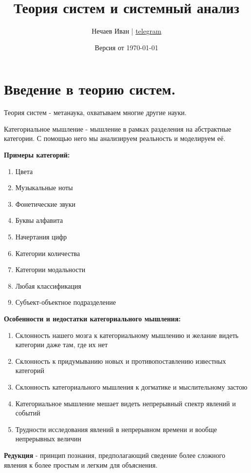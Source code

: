 \documentclass[a4paper]{article}
\title{\Huge Теория систем и системный анализ}
\author{Нечаев Иван | \href{https://t.me/mycherij}{telegram}}
\date{Версия от {\ddmmyyyydate\today} \currenttime}
\begin{document}
	\maketitle
	
	
	
	\tableofcontents
	
	\newpage
	
	\section{Введение в теорию систем.}
	
	Теория систем - метанаука, охватываем многие другие науки.
	
	Категориальное мышление - мышление в рамках разделения на абстрактные категории. С помощью него мы анализируем реальность и моделируем её.
	
	\textbf{Примеры категорий:}
	\begin{enumerate}
		\item Цвета
		\item Музыкальные ноты
		\item Фонетические звуки
		\item Буквы алфавита
		\item Начертания цифр
		\item Категории количества
		\item Категории модальности
		\item Любая классификация
		\item Субъект-объектное подразделение
	\end{enumerate}

	\textbf{Особенности и недостатки категориального мышления:}
	\begin{enumerate}
		\item Склонность нашего мозга к категориальному мышлению и желание видеть категории даже там, где их нет
		\item Склонность к придумыванию новых и противопоставлению известных категорий
		\item Склонность категориального мышления к догматике и мыслительному застою
		\item Категориальное мышление мешает видеть непрерывный спектр явлений и событий
		\item Трудности исследования явлений в непрерывном времени и вообще непрерывных величин
	\end{enumerate}

	\textbf{Редукция} - принцип познания, предполагающий сведение более сложного явления к более простым и легким для объяснения.
	
\end{document}
